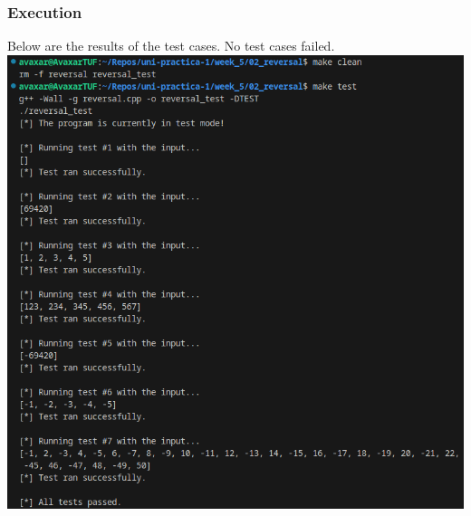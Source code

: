 \documentclass[12pt]{article}
\begin{document}
\subsubsection{Execution}
Below are the results of the test cases. No test cases failed.
\newline\includegraphics[width=\textwidth]{02_reversal_test}
\end{document}

